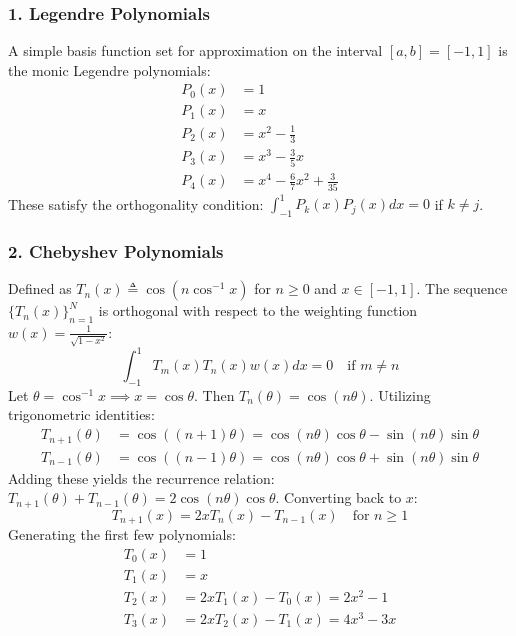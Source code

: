 \documentclass[12pt, a4paper]{article}
\theoremstyle{break}
\begin{document}
\subsubsection*{1. Legendre Polynomials}
A simple basis function set for approximation on the interval $[a,b] = [-1, 1]$ is the monic Legendre polynomials:
\begin{align*}
    P_0(x) &= 1 \\
    P_1(x) &= x \\
    P_2(x) &= x^2 - \frac{1}{3} \\
    P_3(x) &= x^3 - \frac{3}{5}x \\
    P_4(x) &= x^4 - \frac{6}{7}x^2 + \frac{3}{35}
\end{align*}
These satisfy the orthogonality condition: $\int_{-1}^1 P_k(x) P_j(x) dx = 0$ if $k \neq j$.

\subsubsection*{2. Chebyshev Polynomials}
Defined as $T_n(x) \triangleq \cos(n \cos^{-1} x)$ for $n \ge 0$ and $x \in [-1, 1]$.
The sequence $\{T_n(x)\}_{n=1}^N$ is orthogonal with respect to the weighting function $w(x) = \frac{1}{\sqrt{1-x^2}}$:
\begin{equation*}
    \int_{-1}^1 T_m(x) T_n(x) w(x) dx = 0 \quad \text{if } m \neq n
\end{equation*}
Let $\theta = \cos^{-1} x \implies x = \cos \theta$.
Then $T_n(\theta) = \cos(n\theta)$. Utilizing trigonometric identities:
\begin{align*}
    T_{n+1}(\theta) &= \cos((n+1)\theta) = \cos(n\theta)\cos\theta - \sin(n\theta)\sin\theta \\
    T_{n-1}(\theta) &= \cos((n-1)\theta) = \cos(n\theta)\cos\theta + \sin(n\theta)\sin\theta
\end{align*}
Adding these yields the recurrence relation: $T_{n+1}(\theta) + T_{n-1}(\theta) = 2\cos(n\theta)\cos\theta$.
Converting back to $x$:
\begin{equation*}
    T_{n+1}(x) = 2x T_n(x) - T_{n-1}(x) \quad \text{for } n \ge 1
\end{equation*}
Generating the first few polynomials:
\begin{align*}
    T_0(x) &= 1 \\
    T_1(x) &= x \\
    T_2(x) &= 2x T_1(x) - T_0(x) = 2x^2 - 1 \\
    T_3(x) &= 2x T_2(x) - T_1(x) = 4x^3 - 3x
\end{align*}
\end{document}
